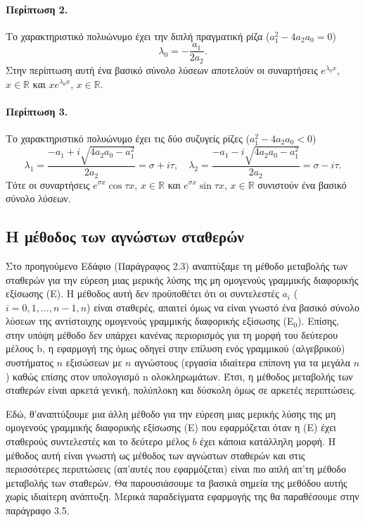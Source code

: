 \documentclass[11pt,a4paper,twoside]{book}
\begin{document}
\paragraph{Περίπτωση 2.} Το χαρακτηριστικό πολυώνυμο έχει την διπλή πραγματική ρίζα ($a_1^2-4a_2a_0=0$)
\[
    \lambda_0 = -\frac{a_1}{2a_2}.
\]
Στην περίπτωση αυτή ένα βασικό σύνολο λύσεων αποτελούν οι συναρτήσεις $e^{\lambda_0 x}$, $x\in\mathbb{R}$ και $xe^{\lambda_0 x}$, $x\in\mathbb{R}$.

\paragraph{Περίπτωση 3.} Το χαρακτηριστικό πολυώνυμο έχει τις δύο συζυγείς ρίζες ($a_1^2-4a_2a_0<0$)
\[
    \lambda_1 = \frac{-a_1+i\sqrt{4a_2a_0-a_1^2}}{2a_2} = \sigma+i\tau, \quad \lambda_2 = \frac{-a_1-i\sqrt{4a_2a_0-a_1^2}}{2a_2} = \sigma-i\tau.
\]
Τότε οι συναρτήσεις $e^{\sigma x}\cos\tau x$, $x\in\mathbb{R}$ και $e^{\sigma x}\sin\tau x$, $x\in\mathbb{R}$ συνιστούν ένα βασικό σύνολο λύσεων.

\subsection{Η μέθοδος των αγνώστων σταθερών}
Στο προηγούμενο Εδάφιο (Παράγραφος 2.3) αναπτύξαμε τη μέθοδο μεταβολής των σταθερών για την εύρεση μιας μερικής λύσης της μη ομογενούς γραμμικής διαφορικής εξίσωσης (Ε). Η μέθοδος αυτή δεν προϋποθέτει ότι οι συντελεστές $a_i$ ($i=0,1,\dots,n-1,n$) είναι σταθερές, απαιτεί όμως να είναι γνωστό ένα βασικό σύνολο λύσεων της αντίστοιχης ομογενούς γραμμικής διαφορικής εξίσωσης (Ε$_0$). Επίσης, στην υπόψη μέθοδο δεν υπάρχει κανένας περιορισμός για τη μορφή του δεύτερου μέλους b, η εφαρμογή της όμως οδηγεί στην επίλυση ενός γραμμικού (αλγεβρικού) συστήματος $n$ εξισώσεων με $n$ αγνώστους (εργασία ιδιαίτερα επίπονη για τα μεγάλα $n$) καθώς επίσης στον υπολογισμό n ολοκληρωμάτων. Έτσι, η μέθοδος μεταβολής των σταθερών είναι αρκετά γενική, πολύπλοκη και δύσκολη όμως σε αρκετές περιπτώσεις.

Εδώ, θ'αναπτύξουμε μια άλλη μέθοδο για την εύρεση μιας μερικής λύσης της μη ομογενούς γραμμικής διαφορικής εξίσωσης (Ε) που εφαρμόζεται όταν η (Ε) έχει σταθερούς συντελεστές και το δεύτερο μέλος $b$ έχει κάποια κατάλληλη μορφή. Η μέθοδος αυτή είναι γνωστή ως μέθοδος των αγνώστων σταθερών και στις περισσότερες περιπτώσεις (απ'αυτές που εφαρμόζεται) είναι πιο απλή απ'τη μέθοδο μεταβολής των σταθερών. Θα παρουσιάσουμε τα βασικά σημεία της μεθόδου αυτής χωρίς ιδιαίτερη ανάπτυξη. Μερικά παραδείγματα εφαρμογής της θα παραθέσουμε στην παράγραφο 3.5.
\end{document}
